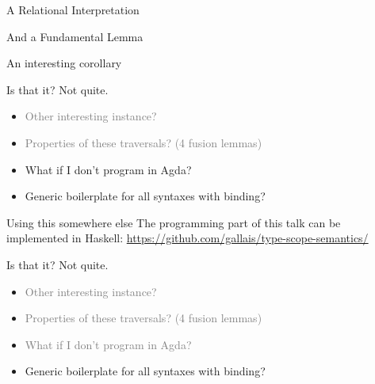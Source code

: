 \documentclass[xetex, mathserif, serif]{beamer}
\begin{document}
  \begin{frame}{A Relational Interpretation}
  \end{frame}

  \begin{frame}{And a Fundamental Lemma}
  \end{frame}

  \begin{frame}{An interesting corollary}
  \end{frame}
  
  \begin{frame}{Is that it? Not quite.}
    \begin{itemize}
      \item \textcolor{gray}{Other interesting instance?}
      \item \textcolor{gray}{Properties of these traversals? (4 fusion lemmas)}
      \item What if I don't program in Agda?
      \item Generic boilerplate for all syntaxes with binding?
    \end{itemize}
  \end{frame}

  \begin{frame}{Using this somewhere else}
    The programming part of this talk can be implemented in Haskell:
    {\small\url{https://github.com/gallais/type-scope-semantics/}}
  \end{frame}

  \begin{frame}{Is that it? Not quite.}
    \begin{itemize}
      \item \textcolor{gray}{Other interesting instance?}
      \item \textcolor{gray}{Properties of these traversals? (4 fusion lemmas)}
      \item \textcolor{gray}{What if I don't program in Agda?}
      \item Generic boilerplate for all syntaxes with binding?
    \end{itemize}
  \end{frame}
\end{document}
